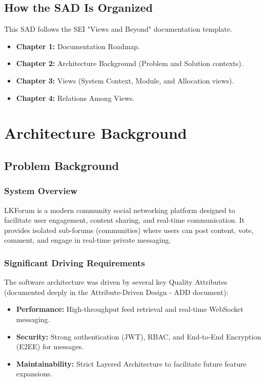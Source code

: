 \documentclass{scrreprt}
\begin{document}
\section{How the SAD Is Organized}
This SAD follows the SEI "Views and Beyond" documentation template.
\begin{itemize}
    \item \textbf{Chapter 1:} Documentation Roadmap.
    \item \textbf{Chapter 2:} Architecture Background (Problem and Solution contexts).
    \item \textbf{Chapter 3:} Views (System Context, Module, and Allocation views).
    \item \textbf{Chapter 4:} Relations Among Views.
\end{itemize}

\chapter{Architecture Background}

\section{Problem Background}
\subsection{System Overview}
LKForum is a modern community social networking platform designed to facilitate user engagement, content sharing, and real-time communication. It provides isolated sub-forums (communities) where users can post content, vote, comment, and engage in real-time private messaging.

\subsection{Significant Driving Requirements}
The software architecture was driven by several key Quality Attributes (documented deeply in the Attribute-Driven Design - ADD document):
\begin{itemize}
    \item \textbf{Performance:} High-throughput feed retrieval and real-time WebSocket messaging.
    \item \textbf{Security:} Strong authentication (JWT), RBAC, and End-to-End Encryption (E2EE) for messages.
    \item \textbf{Maintainability:} Strict Layered Architecture to facilitate future feature expansions.
\end{itemize}
\end{document}
